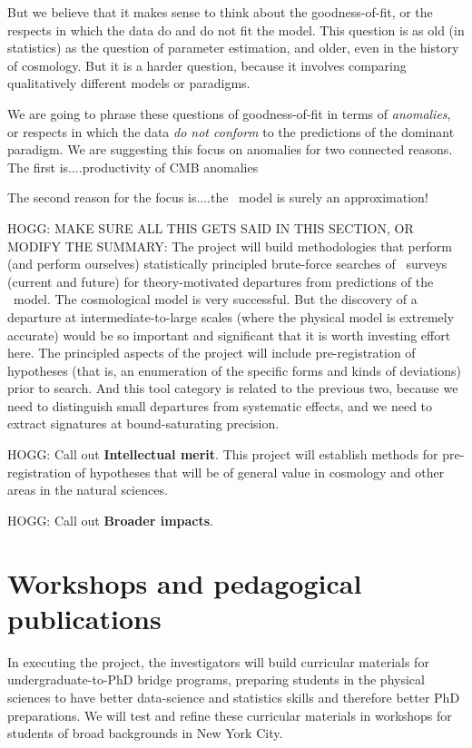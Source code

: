 \documentclass[12pt, fullpage, letterpaper]{article}
\begin{document}
But we believe that it makes sense to think about the goodness-of-fit,
or the respects in which the data do and do not fit the model.
This question is as old (in statistics) as the question of parameter
estimation, and older, even in the history of cosmology.
But it is a harder question, because it involves comparing
qualitatively different models or paradigms.

We are going to phrase these questions of goodness-of-fit in terms of
\emph{anomalies}, or respects in which the data \emph{do not conform}
to the predictions of the dominant paradigm.
We are suggesting this focus on anomalies for two connected reasons.
The first is....productivity of CMB anomalies

The second reason for the focus is....the \LCDM\ model is surely an
approximation!

HOGG: MAKE SURE ALL THIS GETS SAID IN THIS SECTION, OR MODIFY THE SUMMARY:
The project will build methodologies that perform (and perform
ourselves) statistically principled brute-force searches of \LSS\ 
surveys (current and future) for theory-motivated departures from
predictions of the \LCDM\ model.
The cosmological model is very successful.
But the discovery of a departure at intermediate-to-large scales
(where the physical model is extremely accurate) would be so important
and significant that it is worth investing effort here.
The principled aspects of the project will include pre-registration of
hypotheses (that is, an enumeration of the specific forms and kinds of
deviations) prior to search.
And this tool category is related to the previous two, because we need
to distinguish small departures from systematic effects, and we need
to extract signatures at bound-saturating precision.

HOGG: Call out \textbf{Intellectual merit}.
This project will establish methods for pre-registration of hypotheses that
will be of general value in cosmology and other areas in the natural
sciences.

HOGG: Call out \textbf{Broader impacts}.

\section{Workshops and pedagogical publications}

In executing the project, the investigators will build curricular
materials for undergraduate-to-PhD bridge programs, preparing students
in the physical sciences to have better data-science and statistics
skills and therefore better PhD preparations.
We will test and refine these curricular materials in workshops for
students of broad backgrounds in New York City.
\end{document}
